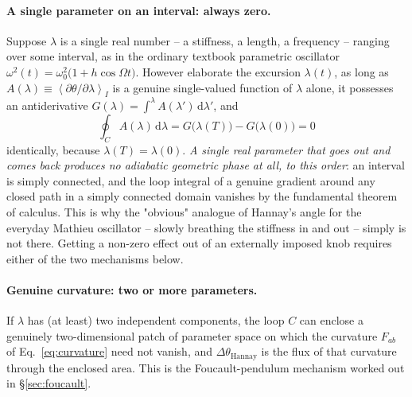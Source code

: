 \documentclass[11pt]{book}
\newcommand{\dd}{\mathrm{d}}
\newcommand{\avg}[1]{\left\langle #1 \right\rangle}
\begin{document}
\paragraph{A single parameter on an interval: always zero.} Suppose $\lambda$ is a single real
number -- a stiffness, a length, a frequency -- ranging over some interval, as in the ordinary
textbook parametric oscillator $\omega^2(t) = \omega_0^2\big(1+h\cos\Omega t\big)$. However
elaborate the excursion $\lambda(t)$, as long as $A(\lambda) \equiv
\avg{\partial\theta/\partial\lambda}_I$ is a genuine single-valued function of $\lambda$ alone, it
possesses an antiderivative $G(\lambda) = \int^\lambda A(\lambda')\,\dd\lambda'$, and
\begin{equation}
\oint_C A(\lambda)\,\dd\lambda = G\big(\lambda(T)\big) - G\big(\lambda(0)\big) = 0
\end{equation}
identically, because $\lambda(T)=\lambda(0)$. \emph{A single real parameter that goes out and comes
back produces no adiabatic geometric phase at all, to this order}: an interval is simply connected,
and the loop integral of a genuine gradient around any closed path in a simply connected domain
vanishes by the fundamental theorem of calculus. This is why the "obvious" analogue of Hannay's
angle for the everyday Mathieu oscillator -- slowly breathing the stiffness in and out -- simply is
not there. Getting a non-zero effect out of an externally imposed knob requires either of the two
mechanisms below.

\paragraph{Genuine curvature: two or more parameters.} If $\lambda$ has (at least) two independent
components, the loop $C$ can enclose a genuinely two-dimensional patch of parameter space on which
the curvature $F_{ab}$ of Eq.~\eqref{eq:curvature} need not vanish, and $\Delta\theta_{\text{Hannay}}$
is the flux of that curvature through the enclosed area. This is the Foucault-pendulum mechanism
worked out in \S\ref{sec:foucault}.
\end{document}
